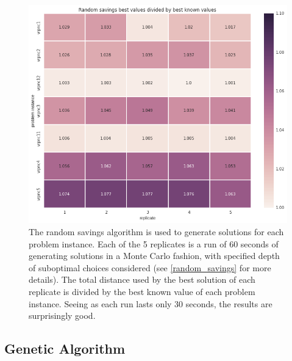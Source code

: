 \documentclass{article} %
\begin{document}
\begin{figure}[!htb]
\begin{center}
 \includegraphics[scale=0.45]{figures/rs_best}
 \caption{\small The random savings algorithm is used to generate solutions for each problem instance. Each of the 5 replicates is a run of 60 seconds of generating solutions in a Monte Carlo fashion, with specified depth of suboptimal choices considered (see \ref{random_savings} for more details). The total distance used by the best solution of each replicate is divided by the best known value of each problem instance. Seeing as each run lasts only 30 seconds, the results are surprisingly good.}
 \label{rs_fig}
 \end{center}
\end{figure}


\newpage
\subsection{Genetic Algorithm}
\end{document}
